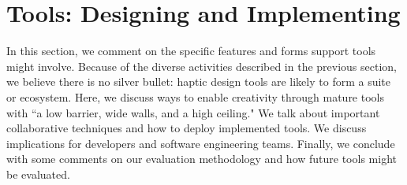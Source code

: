 %
%
%






\section{\haxd Tools: Designing and Implementing}
In this section, we comment on the specific features and forms \haxd support tools might involve.
Because of the diverse activities described in the previous section, we believe there is no silver bullet: haptic design tools are likely to form a suite or ecosystem.
Here, we discuss ways to enable creativity through mature tools with ``a low barrier, wide walls, and a high ceiling."
We  talk about important collaborative techniques and how to deploy implemented tools.
We  discuss implications for developers and software engineering teams.
Finally, we conclude with some comments on our evaluation methodology and how future \haxd tools might be evaluated.


